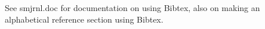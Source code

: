 




See smjrnl.doc for documentation on using Bibtex,
also on making an alphabetical reference section using Bibtex.




